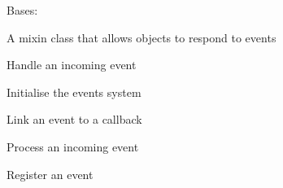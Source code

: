 \documentclass[letterpaper,10pt,english]{sphinxmanual}
\begin{document}
\begin{fulllineitems}
\label{common:serge.common.EventAware}
Bases: 

A mixin class that allows objects to respond to events

\begin{fulllineitems}
\label{common:serge.common.EventAware.handleEvent}
Handle an incoming event

\end{fulllineitems}


\begin{fulllineitems}
\label{common:serge.common.EventAware.initEvents}
Initialise the events system

\end{fulllineitems}


\begin{fulllineitems}
\label{common:serge.common.EventAware.linkEvent}
Link an event to a callback

\end{fulllineitems}


\begin{fulllineitems}
\label{common:serge.common.EventAware.processEvent}
Process an incoming event

\end{fulllineitems}


\begin{fulllineitems}
\label{common:serge.common.EventAware.registerEvent}
Register an event

\end{fulllineitems}



\end{fulllineitems}
\end{document}
